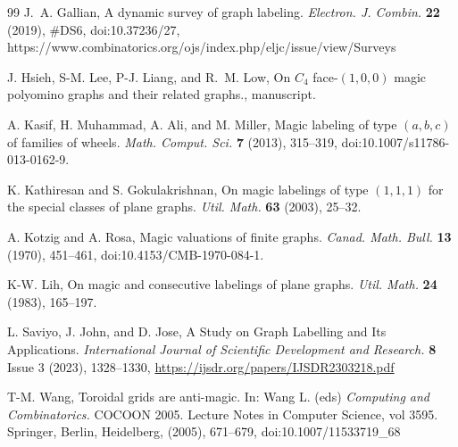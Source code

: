 \documentclass[10pt, reqno]{amsart}
\theoremstyle{definition}
\theoremstyle{plain}
\begin{document}
\begin{thebibliography}{99}
J.~A. Gallian,  A dynamic survey of graph labeling.
\textit{Electron. J. Combin.} \textbf{22} (2019), \#DS6, doi:10.37236/27,
https://www.combinatorics.org/ojs/index.php/eljc/issue/view/Surveys

J. Hsieh, S-M. Lee, P-J. Liang, and R.~M. Low,  On $C_4$ face-$(1, 0, 0)$ magic polyomino graphs and their related graphs.,  manuscript.

A. Kasif, H. Muhammad, A. Ali, and  M. Miller,  Magic labeling of type $(a, b, c)$ of families of wheels.
\textit{Math. Comput. Sci.} \textbf{7} (2013), 315--319, doi:10.1007/s11786-013-0162-9.

K. Kathiresan and S. Gokulakrishnan,  On magic labelings of type $(1, 1, 1)$ for the special classes of plane graphs.
\textit{Util. Math.} \textbf{63} (2003), 25--32.

A. Kotzig  and A. Rosa,  Magic valuations of finite graphs.  \textit{Canad. Math. Bull.} \textbf{13} (1970), 451--461, doi:10.4153/CMB-1970-084-1.

K-W. Lih,  On magic and consecutive labelings of plane graphs.   \textit{Util. Math.} \textbf{24} (1983), 165--197.

L. Saviyo, J. John, and D. Jose, A Study on Graph Labelling and Its Applications.
\textit{International Journal of Scientific Development and Research.}
\textbf{8} Issue 3 (2023), 1328--1330, \url{https://ijsdr.org/papers/IJSDR2303218.pdf}


T-M. Wang, Toroidal grids are anti-magic. In: Wang L. (eds) \textit{Computing and Combinatorics.} COCOON 2005. Lecture Notes in Computer Science, vol 3595. Springer, Berlin, Heidelberg, (2005), 671--679,  doi:10.1007/11533719\_68

\end{thebibliography}
\end{document}
